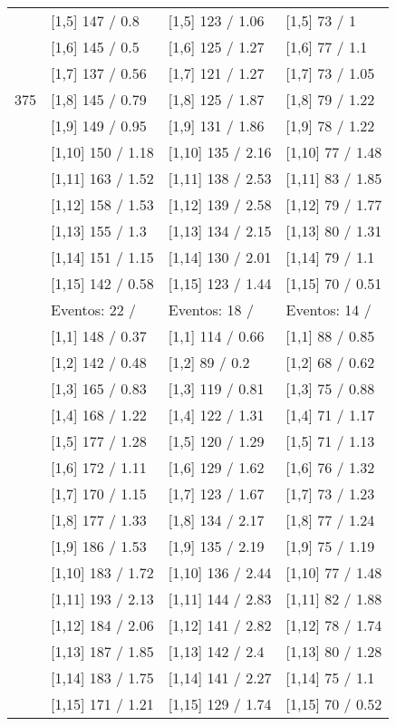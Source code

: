 \begin{table}
\begin{tabular}[t]{llll}
 & {}[1,5] 147  / 0.8 & {}[1,5] 123  / 1.06 & {}[1,5] 73  / 1\\
 & {}[1,6] 145  / 0.5 & {}[1,6] 125  / 1.27 & {}[1,6] 77  / 1.1\\
 & {}[1,7] 137  / 0.56 & {}[1,7] 121  / 1.27 & {}[1,7] 73  / 1.05\\
375 & {}[1,8] 145  / 0.79 & {}[1,8] 125  / 1.87 & {}[1,8] 79  / 1.22\\
\addlinespace
 & {}[1,9] 149  / 0.95 & {}[1,9] 131  / 1.86 & {}[1,9] 78  / 1.22\\
 & {}[1,10] 150  / 1.18 & {}[1,10] 135  / 2.16 & {}[1,10] 77  / 1.48\\
 & {}[1,11] 163  / 1.52 & {}[1,11] 138  / 2.53 & {}[1,11] 83  / 1.85\\
 & {}[1,12] 158  / 1.53 & {}[1,12] 139  / 2.58 & {}[1,12] 79  / 1.77\\
 & {}[1,13] 155  / 1.3 & {}[1,13] 134  / 2.15 & {}[1,13] 80  / 1.31\\
\addlinespace
 & {}[1,14] 151  / 1.15 & {}[1,14] 130  / 2.01 & {}[1,14] 79  / 1.1\\
 & {}[1,15] 142  / 0.58 & {}[1,15] 123  / 1.44 & {}[1,15] 70  / 0.51\\
 & Eventos:  22 / & Eventos:  18 / & Eventos:  14 /\\
 & {}[1,1] 148  / 0.37 & {}[1,1] 114  / 0.66 & {}[1,1] 88  / 0.85\\
 & {}[1,2] 142  / 0.48 & {}[1,2] 89  / 0.2 & {}[1,2] 68  / 0.62\\
\addlinespace
 & {}[1,3] 165  / 0.83 & {}[1,3] 119  / 0.81 & {}[1,3] 75  / 0.88\\
 & {}[1,4] 168  / 1.22 & {}[1,4] 122  / 1.31 & {}[1,4] 71  / 1.17\\
 & {}[1,5] 177  / 1.28 & {}[1,5] 120  / 1.29 & {}[1,5] 71  / 1.13\\
 & {}[1,6] 172  / 1.11 & {}[1,6] 129  / 1.62 & {}[1,6] 76  / 1.32\\
 & {}[1,7] 170  / 1.15 & {}[1,7] 123  / 1.67 & {}[1,7] 73  / 1.23\\
\addlinespace
500 & {}[1,8] 177  / 1.33 & {}[1,8] 134  / 2.17 & {}[1,8] 77  / 1.24\\
 & {}[1,9] 186  / 1.53 & {}[1,9] 135  / 2.19 & {}[1,9] 75  / 1.19\\
 & {}[1,10] 183  / 1.72 & {}[1,10] 136  / 2.44 & {}[1,10] 77  / 1.48\\
 & {}[1,11] 193  / 2.13 & {}[1,11] 144  / 2.83 & {}[1,11] 82  / 1.88\\
 & {}[1,12] 184  / 2.06 & {}[1,12] 141  / 2.82 & {}[1,12] 78  / 1.74\\
\addlinespace
 & {}[1,13] 187  / 1.85 & {}[1,13] 142  / 2.4 & {}[1,13] 80  / 1.28\\
 & {}[1,14] 183  / 1.75 & {}[1,14] 141  / 2.27 & {}[1,14] 75  / 1.1\\
 & {}[1,15] 171  / 1.21 & {}[1,15] 129  / 1.74 & {}[1,15] 70  / 0.52\\
\bottomrule
\end{tabular}
\end{table}
